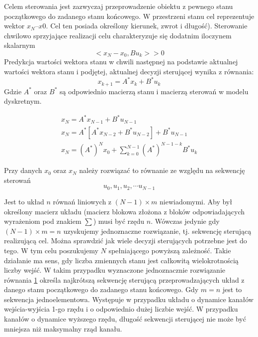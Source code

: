 \documentclass{article}
\begin{document}
			Celem sterowania jest zazwyczaj przeprowadzenie obiektu z pewnego stanu
			początkowego do zadanego stanu końcowego. W przestrzeni stanu cel reprezentuje
			wektor $x_N – x0$. Cel ten posiada określony kierunek, zwrot i długość).
			Sterowanie chwilowo
			sprzyjające realizacji celu charakteryzuje się dodatnim iloczynem skalarnym
			\begin{equation}
				<x_N-x_0, Bu_k> > 0
			\end{equation}
			Predykcja wartości wektora stanu w chwili następnej na podstawie aktualnej wartości
			wektora stanu i podjętej, aktualnej decyzji sterującej wynika z równania:
			\begin{equation}
				x_{k+1} = A^*x_k + B^*u_k
			\end{equation}
			Gdzie $A^*$ oraz $B^*$ są odpowiednio macierzą stanu i
			macierzą sterowań w modelu dyskretnym.
			\begin{figure}[H]
				\begin{align*}
					x_N = A^*x_{N-1} + B^*u_{N-1} \\
					x_N = A^*[A^*x_{N-2}+B^*u_{N-2}] + B^*u_{N-1} \\
					x_N = (A^*)^Nx_0+\sum^{N-1}_{k=0}(A^*)^{N-1-k}B^*u_k
				\end{align*}
				\label{suma}
			\end{figure}
			Przy danych $x_0$ oraz $x_N$ należy rozwiązać to równanie 
			ze względu na sekwencję sterowań
			\begin{equation}
				u_0,u_1,u_2,\cdots u_{N-1}
			\end{equation}

			Jest to układ $n$ równań liniowych z $(N-1) \times m$ niewiadomymi.
			Aby był określony macierz układu (macierz blokowa złożona z bloków odpowiadających
			wyrażeniom pod znakiem $\sum$) musi być rzędu $n$.
			Wówczas jedynie gdy $(N-1) \times m =n$
			uzyskujemy jednoznaczne rozwiązanie, tj. sekwencję sterującą realizującą cel.
			Można sprawdzić jak wiele decyzji sterujących potrzebne jest do tego. W tym celu
			poszukujemy $N$ spełniającego powyższą zależność. Takie działanie ma sens, gdy liczba
			zmiennych stanu jest całkowitą wielokrotnością liczby wejść.
			W takim przypadku wyznaczone jednoznacznie rozwiązanie
			równania \ref{suma} określa najkrótszą sekwencję sterującą
			przeprowadzających układ z danego stanu początkowego do
			zadanego stanu końcowego.
			Gdy $m=n$ jest to sekwencja jednoelementowa. Występuje w przypadku
			układu o dynamice kanałów
			wejścia-wyjścia 1-go rzędu i o odpowiednio dużej liczbie wejść. W przypadku kanałów o
			dynamice wyższego rzędu, długość sekwencji sterującej nie może być mniejsza niż
			maksymalny rząd kanału.
\end{document}
